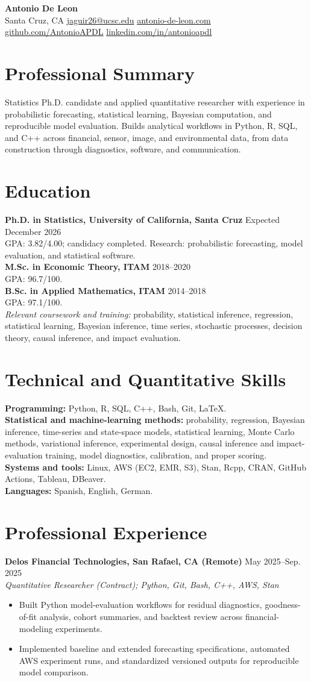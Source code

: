 \documentclass[10pt,letterpaper]{article}
\newcommand{\cvsection}[1]{%
  \Needspace{4\baselineskip}%
  \section*{#1}%
}
\newcommand{\entry}[3]{%
  \Needspace{5\baselineskip}%
  \textbf{#1} \hfill #2\\
  \textit{#3}\\[-2pt]
}
\newcommand{\educationentry}[3]{%
  \Needspace{2\baselineskip}%
  \textbf{#1} \hfill #2\\
  #3\\[-1pt]
}
\newcommand{\contactsep}{\enspace\textbar\enspace}
\newcommand{\tightspace}{\vspace{1pt}}
\begin{document}
\color{textgray}

\begin{center}
  {\LARGE\bfseries\color{navy} Antonio De Leon}\\[4pt]
  Santa Cruz, CA\contactsep
  \href{mailto:jaguir26@ucsc.edu}{jaguir26@ucsc.edu}\contactsep
  \href{https://antonio-de-leon.com}{antonio-de-leon.com}\contactsep
  \href{https://github.com/AntonioAPDL}{github.com/AntonioAPDL}\contactsep
  \href{https://linkedin.com/in/antonioapdl}{linkedin.com/in/antonioapdl}
\end{center}

\cvsection{Professional Summary}
Statistics Ph.D. candidate and applied quantitative researcher with experience in probabilistic forecasting, statistical learning, Bayesian computation, and reproducible model evaluation. Builds analytical workflows in Python, R, SQL, and C++ across financial, sensor, image, and environmental data, from data construction through diagnostics, software, and communication.

\cvsection{Education}
\educationentry{Ph.D. in Statistics, University of California, Santa Cruz}{Expected December 2026}{GPA: 3.82/4.00; candidacy completed. Research: probabilistic forecasting, model evaluation, and statistical software.}
\educationentry{M.Sc. in Economic Theory, ITAM}{2018--2020}{GPA: 96.7/100.}
\educationentry{B.Sc. in Applied Mathematics, ITAM}{2014--2018}{GPA: 97.1/100.}
\textit{Relevant coursework and training:} probability, statistical inference, regression, statistical learning, Bayesian inference, time series, stochastic processes, decision theory, causal inference, and impact evaluation.

\cvsection{Technical and Quantitative Skills}
\textbf{Programming:} Python, R, SQL, C++, Bash, Git, LaTeX.\\
\textbf{Statistical and machine-learning methods:} probability, regression, Bayesian inference, time-series and state-space models, statistical learning, Monte Carlo methods, variational inference, experimental design, causal inference and impact-evaluation training, model diagnostics, calibration, and proper scoring.\\
\textbf{Systems and tools:} Linux, AWS (EC2, EMR, S3), Stan, Rcpp, CRAN, GitHub Actions, Tableau, DBeaver.\\
\textbf{Languages:} Spanish, English, German.

\cvsection{Professional Experience}
\entry{Delos Financial Technologies, San Rafael, CA (Remote)}{May 2025--Sep. 2025}{Quantitative Researcher (Contract); Python, Git, Bash, C++, AWS, Stan}
\begin{itemize}
  \item Built Python model-evaluation workflows for residual diagnostics, goodness-of-fit analysis, cohort summaries, and backtest review across financial-modeling experiments.
  \item Implemented baseline and extended forecasting specifications, automated AWS experiment runs, and standardized versioned outputs for reproducible model comparison.
\end{itemize}
\tightspace
\end{document}

